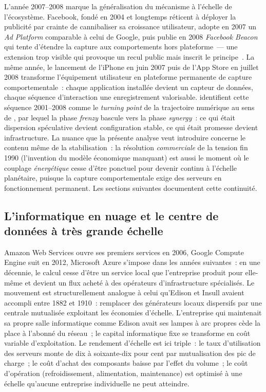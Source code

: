 %
L'année 2007--2008 marque la généralisation du mécanisme à l'échelle de l'écosystème. Facebook, fondé en 2004 et longtemps réticent à déployer la publicité par crainte de cannibaliser sa croissance utilisateur, adopte en 2007 un \emph{Ad Platform} comparable à celui de Google, puis publie en 2008 \emph{Facebook Beacon} qui tente d'étendre la capture aux comportements hors plateforme~--- une extension trop visible qui provoque un recul public mais inscrit le principe~\parencite{west_data_2019}. La même année, le lancement de l'iPhone en juin 2007 puis de l'App Store en juillet 2008 transforme l'équipement utilisateur en plateforme permanente de capture comportementale~: chaque application installée devient un capteur de données, chaque séquence d'interaction une enregistrement valorisable. \textcite{johnstone_deep_2026} identifient cette séquence 2001--2008 comme le \emph{turning point} de la trajectoire numérique au sens de \textcite{perez_technological_2002}, par lequel la phase \emph{frenzy} bascule vers la phase \emph{synergy}~: ce qui était dispersion spéculative devient configuration stable, ce qui était promesse devient infrastructure. La nuance que la présente analyse veut introduire concerne le contenu même de la stabilisation~: la résolution \emph{commerciale} de la tension fin 1990 (l'invention du modèle économique manquant) est aussi le moment où le couplage \emph{énergétique} cesse d'être ponctuel pour devenir continu à l'échelle planétaire, puisque la capture comportementale exige des serveurs en fonctionnement permanent. Les sections suivantes documentent cette continuité.


\subsection{L'informatique en nuage et le centre de données à très grande échelle}\label{subsec:cloud}

%
Amazon Web Services ouvre ses premiers services en 2006, Google Compute Engine suit en 2012, Microsoft Azure s'impose dans les années suivantes~: en une décennie, le calcul cesse d'être un service local que l'entreprise produit pour elle-même et devient un flux acheté à des opérateurs d'infrastructure spécialisés. Le mouvement est structurellement analogue à celui qu'Edison et Insull avaient accompli entre 1882 et 1910~: remplacer des générateurs locaux dispersifs par une centrale mutualisée exploitant les économies d'échelle. L'entreprise qui maintenait sa propre salle informatique comme Edison avait ses lampes à arc propres cède la place à l'abonné du réseau~; le capital informatique fixe se transforme en coût variable d'exploitation. Le rendement d'échelle est ici triple~: le taux d'utilisation des serveurs monte de dix à soixante-dix pour cent par mutualisation des pic de charge~; le coût d'achat des composants baisse par l'effet du volume~; le coût d'opération (refroidissement, alimentation, maintenance) est optimisé à une échelle qu'aucune entreprise individuelle ne peut atteindre.

